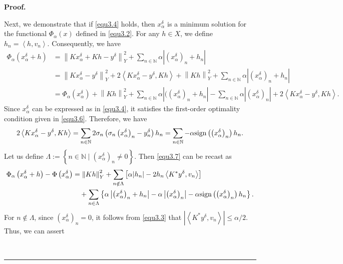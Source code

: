 \documentclass[a4paper,12pt]{article}
\numberwithin{equation}{section}
\newenvironment{proof}[1][Proof]{\textbf{#1.} }
{\ \rule{0.75em}{0.75em}\smallskip}
\begin{document}
\begin{proof}
    \par Next, we demonstrate that if \eqref{equ3.4} holds, then $x_{\alpha}^{\delta}$ is a minimum solution for the functional $\Phi_{\alpha}\left(x\right)$ defined in \eqref{equ3.2}. For any $h\in X$, we define $h_{n}=\left<h, v_{n}\right>$. Consequently, we have
    \begin{align}\label{equ3.7}
        \Phi_{\alpha}\left(x_{\alpha}^{\delta}+h\right)
        & =\left\|Kx_{\alpha}^{\delta}+Kh-y^{\delta}\right\|_Y^{2}+ \sum_{n\in\mathbb{N}}\alpha\left|\left(x_{\alpha}^{\delta}\right)_{n}+h_{n}\right| \nonumber\\
        & =\left\|Kx_{\alpha}^{\delta}-y^{\delta}\right\|_Y^{2}+ 2\left<Kx_{\alpha}^{\delta}-y^{\delta},Kh\right>+\left\|Kh\right\|_Y^{2}+ \sum_{n\in\mathbb{N}}\alpha\left|\left(x_{\alpha}^{\delta}\right)_{n}+h_{n}\right| \nonumber\\
        & =\Phi_{\alpha}\left(x_{\alpha}^{\delta}\right)+\left\|Kh\right\|_Y^{2}+ \sum_{n\in\mathbb{N}}\alpha\left|(\left(x_{\alpha}^{\delta}\right)_{n}+h_{n}\right| -\sum_{n\in\mathbb{N}}\alpha\left|\left(x_{\alpha}^{\delta}\right)_{n}\right|+ 2\left<Kx_{\alpha}^{\delta}-y^{\delta},Kh\right>. 
    \end{align}
    Since $x_{\alpha}^{\delta}$ can be expressed as in \eqref{equ3.4}, it satisfies the first-order optimality condition given in \eqref{equ3.6}. Therefore, we have
    \begin{equation*}
        2\left<Kx_{\alpha}^{\delta}-y^{\delta},Kh\right>= \sum_{n\in\mathbb{N}}2\sigma_{n}\left(\sigma_{n}\left(x_{\alpha}^{\delta}\right)_{n} -y^{\delta}_{n}\right) h_{n} =\sum_{n\in\mathbb{N}}-\alpha{\rm{sign}} \left(\left(x_{\alpha}^{\delta}\right)_{n}\right)h_{n}.
    \end{equation*}
    Let us define $\Lambda:=\left\{n\in\mathbb{N} \mid \left(x_{\alpha}^{\delta}\right)_{n}\neq 0\right\}$. Then \eqref{equ3.7} can be recast as
    \begin{align*}
        \Phi_{\alpha}\left(x_{\alpha}^{\delta}+h\right)-\Phi\left(x_{\alpha}^{\delta}\right)
        & =\left\|Kh\right\|_Y^{2}+\sum_{n\notin\Lambda}\left[\alpha|h_{n}|- 2h_{n}\left<K^{*}y^{\delta},v_{n}\right>\right] \nonumber\\
        & \quad +\sum_{n\in\Lambda}\left\{\alpha\left|\left(x_{\alpha}^{\delta}\right)_{n}+h_{n}\right|- \alpha\left|\left(x_{\alpha}^{\delta}\right)_{n}\right| -\alpha{\rm{sign}}\left(\left(x_{\alpha}^{\delta}\right)_{n}\right)h_{n}\right\}.
    \end{align*}
    For $n\notin\Lambda$, since $\left(x_{\alpha}^{\delta}\right)_{n}=0$, it follows from \eqref{equ3.3} that $|\left<K^{*}y^{\delta},v_{n}\right>|\leq\alpha/2$. Thus, we can assert

\end{proof}
\end{document}
